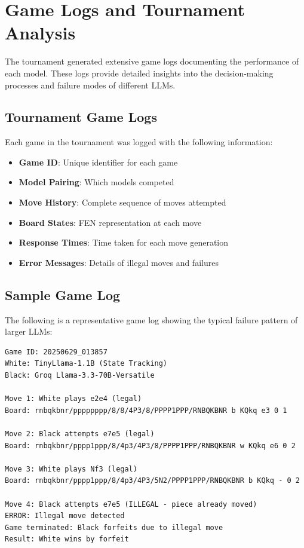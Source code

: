 \documentclass[11pt,a4paper]{report}
\begin{document}
\section{Game Logs and Tournament Analysis}
The tournament generated extensive game logs documenting the performance of each model. These logs provide detailed insights into the decision-making processes and failure modes of different LLMs.

\subsection{Tournament Game Logs}
Each game in the tournament was logged with the following information:

\begin{itemize}
    \item \textbf{Game ID}: Unique identifier for each game
    \item \textbf{Model Pairing}: Which models competed
    \item \textbf{Move History}: Complete sequence of moves attempted
    \item \textbf{Board States}: FEN representation at each move
    \item \textbf{Response Times}: Time taken for each move generation
    \item \textbf{Error Messages}: Details of illegal moves and failures
\end{itemize}

\subsection{Sample Game Log}
The following is a representative game log showing the typical failure pattern of larger LLMs:

\begin{lstlisting}[style=Python]
Game ID: 20250629_013857
White: TinyLlama-1.1B (State Tracking)
Black: Groq Llama-3.3-70B-Versatile

Move 1: White plays e2e4 (legal)
Board: rnbqkbnr/pppppppp/8/8/4P3/8/PPPP1PPP/RNBQKBNR b KQkq e3 0 1

Move 2: Black attempts e7e5 (legal)
Board: rnbqkbnr/pppp1ppp/8/4p3/4P3/8/PPPP1PPP/RNBQKBNR w KQkq e6 0 2

Move 3: White plays Nf3 (legal)
Board: rnbqkbnr/pppp1ppp/8/4p3/4P3/5N2/PPPP1PPP/RNBQKBNR b KQkq - 0 2

Move 4: Black attempts e7e5 (ILLEGAL - piece already moved)
ERROR: Illegal move detected
Game terminated: Black forfeits due to illegal move
Result: White wins by forfeit
\end{lstlisting}
\end{document}
